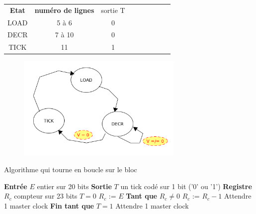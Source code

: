 \documentclass[10pt]{article}
\begin{document}
            
        \begin{table}[h]
            \centering
            \begin{tabular}{ccccccccc}
                   \textbf{Etat} & \textbf{numéro de lignes} & sortie T \\
                     LOAD        &         5 à 6             &    0     \\
                     DECR        &         7 à 10            &    0     \\
                     TICK        &          11               &    1     \\
                \end{tabular}
        \end{table}
        
        \begin{figure}[h!]
            \includegraphics[width=8cm]{h100diag.png}
            \caption{}
        \end{figure}
        
        
        \newpage
        \begin{algorithm}
            \caption{Algorithme qui tourne en boucle sur le bloc}
            \begin{algorithmic}[1]
                \State \textbf{Entrée} $E$ entier sur 20 bits
                \State \textbf{Sortie} $T$ un tick codé sur 1 bit ('0' ou '1')
                \State \textbf{Registre} $R_c$ compteur sur 23 bits
                    \State $T = 0$
                    \State $R_c$ := $E$
                    \State \textbf{Tant que} $R_c \neq 0$
                        \State \qquad $R_c$ := $R_c - 1$
                        \State \qquad Attendre 1 master clock
                    \State \textbf{Fin tant que}
                    \State $T = 1$
                    \State Attendre 1 master clock
                \EndFunction
            \end{algorithmic}
        \end{algorithm}
        
\end{document}
